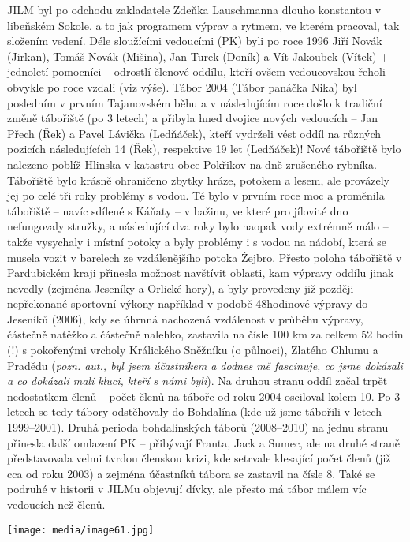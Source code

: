 JILM byl po odchodu zakladatele Zdeňka Lauschmanna dlouho konstantou v
libeňském Sokole, a to jak programem výprav a rytmem, ve kterém
pracoval, tak složením vedení. Déle sloužícími vedoucími (PK) byli po
roce 1996 Jiří Novák (Jirkan), Tomáš Novák (Mišina), Jan Turek (Doník) a
Vít Jakoubek (Vítek) + jednoletí pomocníci -- odrostlí členové oddílu,
kteří ovšem vedoucovskou řeholi obvykle po roce vzdali (viz výše). Tábor
2004 (Tábor panáčka Nika) byl posledním v prvním Tajanovském běhu a v
následujícím roce došlo k tradiční změně tábořiště (po 3 letech) a
přibyla hned dvojice nových vedoucích -- Jan Přech (Řek) a Pavel Lávička
(Ledňáček), kteří vydrželi vést oddíl na různých pozicích následujících
14 (Řek), respektive 19 let (Ledňáček)! Nové tábořiště bylo nalezeno
poblíž Hlinska v katastru obce Pokřikov na dně zrušeného rybníka.
Tábořiště bylo krásně ohraničeno zbytky hráze, potokem a lesem, ale
provázely jej po celé tři roky problémy s vodou. Té bylo v prvním roce
moc a proměnila tábořiště -- navíc sdílené s Káňaty -- v bažinu, ve
které pro jílovité dno nefungovaly stružky, a následující dva roky bylo
naopak vody extrémně málo -- takže vysychaly i místní potoky a byly
problémy i s vodou na nádobí, která se musela vozit v barelech ze
vzdálenějšího potoka Žejbro. Přesto poloha tábořiště v Pardubickém kraji
přinesla možnost navštívit oblasti, kam výpravy oddílu jinak nevedly
(zejména Jeseníky a Orlické hory), a byly provedeny již později
nepřekonané sportovní výkony například v podobě 48hodinové výpravy do
Jeseníků (2006), kdy se úhrnná nachozená vzdálenost v průběhu výpravy,
částečně natěžko a částečně nalehko, zastavila na čísle 100 km za celkem
52 hodin (!) s pokořenými vrcholy Králického Sněžníku (o půlnoci),
Zlatého Chlumu a Pradědu (\emph{pozn. aut., byl jsem účastníkem a dodnes
mě fascinuje, co jsme dokázali a co dokázali malí kluci, kteří s námi
byli}). Na druhou stranu oddíl začal trpět nedostatkem členů -- počet
členů na táboře od roku 2004 osciloval kolem 10. Po 3 letech se tedy
tábory odstěhovaly do Bohdalína (kde už jsme tábořili v letech
1999--2001). Druhá perioda bohdalínských táborů (2008--2010) na jednu
stranu přinesla další omlazení PK -- přibývají Franta, Jack a Sumec, ale
na druhé straně představovala velmi tvrdou členskou krizi, kde setrvale
klesající počet členů (již cca od roku 2003) a zejména účastníků tábora
se zastavil na čísle 8. Také se podruhé v historii v JILMu objevují
dívky, ale přesto má tábor málem víc vedoucích než členů.

\texttt{[image: media/image61.jpg]}

